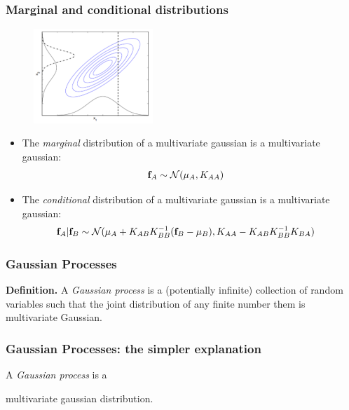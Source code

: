 \documentclass{beamer}
\begin{document}
\begin{frame}
    \frametitle{Marginal and conditional distributions}

    \begin{figure}
    \includegraphics[width=0.4\textwidth]{./figures/mg.png}
    \end{figure}

        \begin{itemize}
            \item The {\it marginal} distribution of a multivariate gaussian is a multivariate gaussian:
            \begin{align*}
                &{\mathbf{f}_A}  \sim {\cal N}(\mu_A, K_{AA})
            \end{align*}

            \item The {\it conditional} distribution of a multivariate gaussian is a multivariate gaussian:
            \begin{align*}
                &{\mathbf{f}_A}|{\mathbf{f}_B}  \sim {\cal N}(\mu_A + K_{AB}K_{BB}^{-1}({\mathbf{f}_B} - \mu_B), K_{AA} - K_{AB}K_{BB}^{-1}K_{BA})
            \end{align*}
        \end{itemize}
\end{frame}


\begin{frame}
    \frametitle{Gaussian Processes}

    {\bf Definition.} A {\it Gaussian process} is a (potentially infinite) collection
    of random variables such that the joint distribution of any finite
    number them is multivariate Gaussian.
\end{frame}


\begin{frame}
    \frametitle{Gaussian Processes: the simpler explanation}

    \begin{center}
        A {\it Gaussian process} is a

        \vspace{1cm}


        \vspace{1cm}


        multivariate gaussian distribution.
    \end{center}
\end{frame}
\end{document}

